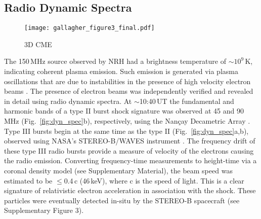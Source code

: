 \subsection{Radio Dynamic Spectra}\label{sec:20}

\begin{sidewaysfigure}
    \centering
\texttt{[image: gallagher\_figure3\_final.pdf]}
\caption{3D CME}
\label{fig:3d_cme}
\end{sidewaysfigure}



The 150\,MHz source observed by NRH had a brightness temperature of $\sim$$10^9$\,K, indicating coherent plasma emission. Such emission is generated via plasma oscillations that are due to instabilities in the presence of high velocity electron beams \citep{dulk1985}. The presence of electron beams was independently verified and revealed in detail using radio dynamic spectra. At $\sim$10:40\,UT the fundamental and harmonic bands of a type II burst shock signature was observed at 45 and 90\,MHz (Fig.~\ref{fig:dyn_spec}b), respectively, using the Nan\c{c}ay Decametric Array \citep[NDA;][]{boischot1980}. Type III bursts begin at the same time as the type II (Fig.~\ref{fig:dyn_spec}a,b), observed using NASA's STEREO-B/WAVES instrument \citep{bougeret2008}. 
The frequency drift of these type III radio bursts provide a measure of velocity of the electrons causing the radio emission. Converting frequency-time measurements to height-time via a coronal density model (see Supplementary Material),  the beam speed was estimated to be $\leq$0.4\,c (46\,keV), where c is the speed of light. This is a clear signature of relativistic electron acceleration in association with the shock. These particles were eventually detected in-situ by the STEREO-B spacecraft (see Supplementary Figure 3).



